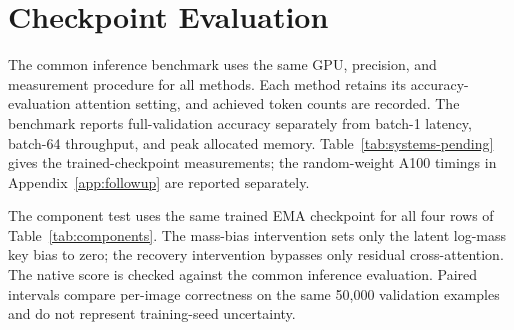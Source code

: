 \section{Checkpoint Evaluation}
\label{app:pending-evaluations}

The common inference benchmark uses the same GPU, precision, and
measurement procedure for all methods. Each method retains its
accuracy-evaluation attention setting, and achieved token counts
are recorded. The benchmark reports
full-validation accuracy separately
from batch-1 latency, batch-64 throughput, and peak allocated memory.
Table~\ref{tab:systems-pending} gives the trained-checkpoint measurements;
the random-weight A100 timings in Appendix~\ref{app:followup}
are reported separately.

\begin{table}[h]
\caption{Common-protocol trained-checkpoint inference at 224 pixels.
B1/B64 denote batch sizes 1 and 64.}
\label{tab:systems-pending}
\centering\footnotesize
\setlength{\tabcolsep}{2.8pt}

\end{table}

The component test uses the same trained \mn{} EMA checkpoint
for all four rows of Table~\ref{tab:components}. The mass-bias
intervention sets only the latent log-mass key bias to zero;
the recovery intervention bypasses only residual cross-attention.
The native score is checked against the common inference evaluation.
Paired intervals compare per-image correctness on the same
50,000 validation examples and do not represent training-seed
uncertainty.

\begin{table}[h]
\caption{Inference-only component test at 224 pixels.
$\Delta$ and its paired 95\% interval are relative to native top-1.}
\label{tab:components}
\centering\small

\end{table}
